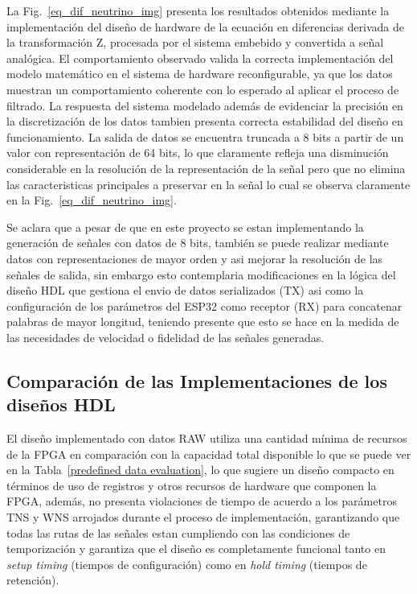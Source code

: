 \documentclass[conference]{IEEEtran}
\begin{document}
{La Fig.~\ref{eq_dif_neutrino_img} presenta los resultados obtenidos mediante la implementación del diseño de hardware de la ecuación en diferencias derivada de la transformación Z, procesada por el sistema embebido y convertida a señal analógica. El comportamiento observado valida la correcta implementación del modelo matemático en el sistema de hardware reconfigurable, ya que los datos muestran un comportamiento coherente con lo esperado al aplicar el proceso de filtrado. La respuesta del sistema modelado además de evidenciar la precisión en la discretización de los datos tambien presenta correcta estabilidad del diseño en funcionamiento. La salida de datos se encuentra truncada a 8 bits a partir de un valor con representación de 64 bits, lo que claramente refleja una disminución considerable en la resolución de la representación de la señal pero que no elimina las caracteristicas principales a preservar en la señal lo cual se observa claramente en la Fig.~\ref{eq_dif_neutrino_img}.

Se aclara que a pesar de que en este proyecto se estan implementando la generación de señales con datos de 8 bits, también se puede realizar mediante datos con representaciones de mayor orden y asi mejorar la resolución de las señales de salida, sin embargo esto contemplaria modificaciones en la lógica del diseño HDL que gestiona el envio de datos serializados (TX) asi como la configuración de los parámetros del ESP32 como receptor (RX) para concatenar palabras de mayor longitud, teniendo presente que esto se hace en la medida de las necesidades de velocidad o fidelidad de las señales generadas.

\subsection{Comparación de las Implementaciones de los diseños HDL}

El diseño implementado con datos RAW utiliza una cantidad mínima de recursos de la FPGA en comparación con la capacidad total disponible lo que se puede ver en la Tabla~\ref{predefined data evaluation}, lo que sugiere un diseño compacto en términos de uso de registros y otros recursos de hardware que componen la FPGA, además, no presenta violaciones de tiempo de acuerdo a los parámetros TNS y WNS arrojados durante el proceso de implementación, garantizando que todas las rutas de las señales estan cumpliendo con las condiciones de temporización y garantiza que el diseño es completamente funcional tanto en \textit{setup timing} (tiempos de configuración) como en \textit{hold timing} (tiempos de retención).

}
\end{document}
